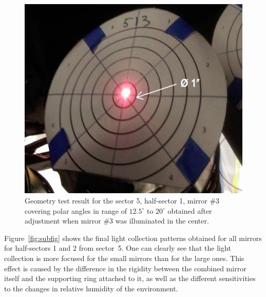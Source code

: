 \begin{figure}[ht]
    \centering
    \includegraphics[width=1.0\linewidth,trim={0 0cm 0 0},clip]{images/GEO_TEST_5_1_3_Center.jpg}
    \caption{Geometry test result for the sector 5, half-sector 1, mirror \#3 covering polar angles in range of
      $12.5^\circ$ to $20^\circ$ obtained after adjustment when mirror \#3 was illuminated in the center.}
    \label{fig:GEO_TEST_5_1_3_Center}
\end{figure}

Figure~\ref{fig:subfig} shows the final light collection patterns obtained for all mirrors for half-sectors 1 and
2 from sector~5. One can clearly see that the light collection is more focused for the small mirrors than for the
large ones. This effect is caused by the difference in the rigidity between the combined mirror itself and the
supporting ring attached to it, as well as the different sensitivities to the changes in relative humidity of the
environment.
 

